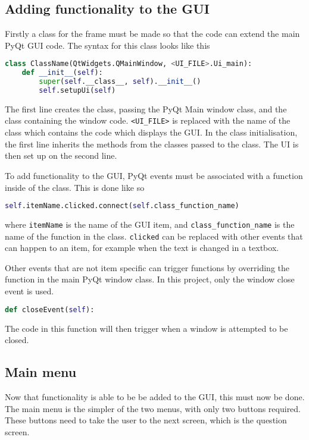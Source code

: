 \subsection{Adding functionality to the GUI}
Firstly a class for the frame must be made so that the code can extend the main PyQt GUI code. The syntax for this class looks like this
\begin{lstlisting}[language=Python, caption=Syntax for Python class declaration]
class ClassName(QtWidgets.QMainWindow, <UI_FILE>.Ui_main):
    def __init__(self):
		super(self.__class__, self).__init__()
		self.setupUi(self)
\end{lstlisting}
The first line creates the class, passing the PyQt Main window class, and the class containing the window code. \texttt{<UI\_FILE>} is replaced with the name of the class which contains the code which displays the GUI. In the class initialisation, the first line inherits the methods from the classes passed to the class. The UI is then set up on the second line.

To add functionality to the GUI, PyQt events must be associated with a function inside of the class. This is done like so
\begin{lstlisting}[language=Python, caption=Syntax for linking PyQt event with class function]
self.itemName.clicked.connect(self.class_function_name)
\end{lstlisting}
where \texttt{itemName} is the name of the GUI item, and \texttt{class\_function\_name} is the name of the function in the class. \texttt{clicked} can be replaced with other events that can happen to an item, for example when the text is changed in a textbox.

Other events that are not item specific can trigger functions by overriding the function in the main PyQt window class. In this project, only the window close event is used.
\begin{lstlisting}[language=Python, caption=Syntax for item exclusive events]
def closeEvent(self):
\end{lstlisting}
The code in this function will then trigger when a window is attempted to be closed.
\subsection{Main menu}
Now that functionality is able to be be added to the GUI, this must now be done. The main menu is the simpler of the two menus, with only two buttons required. These buttons need to take the user to the next screen, which is the question screen.

